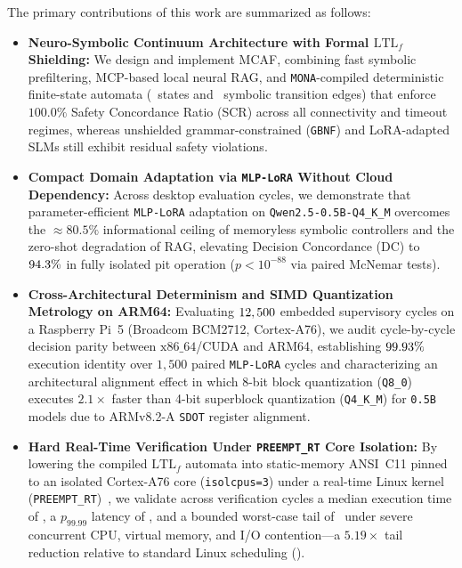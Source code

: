 \documentclass{ieeeaccess}
\begin{document}
The primary contributions of this work are summarized as follows:
\begin{itemize}
    \item \textbf{Neuro-Symbolic Continuum Architecture with Formal $\mathrm{LTL}_f$ Shielding:} We design and implement MCAF, combining fast symbolic prefiltering, MCP-based local neural RAG, and \texttt{MONA}-compiled deterministic finite-state automata (\ShieldStatesTotal~states and \ShieldEdgesTotal~symbolic transition edges) that enforce $100.0\%$ Safety Concordance Ratio (\textsc{SCR}) across all connectivity and timeout regimes, whereas unshielded grammar-constrained (\texttt{GBNF}) and LoRA-adapted SLMs still exhibit residual safety violations.
    \item \textbf{Compact Domain Adaptation via \texttt{MLP-LoRA} Without Cloud Dependency:} Across {\TotalDesktopCycles} desktop evaluation cycles, we demonstrate that parameter-efficient \texttt{MLP-LoRA} adaptation on \texttt{Qwen2.5-0.5B-Q4\_K\_M} overcomes the $\approx 80.5\%$ informational ceiling of memoryless symbolic controllers and the zero-shot degradation of RAG, elevating Decision Concordance (\textsc{DC}) to $94.3\%$ in fully isolated pit operation ($p < 10^{-88}$ via paired McNemar tests).
    \item \textbf{Cross-Architectural Determinism and SIMD Quantization Metrology on ARM64:} Evaluating $12,500$ embedded supervisory cycles on a Raspberry Pi~5 (Broadcom BCM2712, Cortex-A76), we audit cycle-by-cycle decision parity between $\text{x86\_64}$/CUDA and ARM64, establishing $99.93\%$ execution identity over $1{,}500$ paired \texttt{MLP-LoRA} cycles and characterizing an architectural alignment effect in which 8-bit block quantization (\texttt{Q8\_0}) executes $2.1\times$ faster than 4-bit superblock quantization (\texttt{Q4\_K\_M}) for \texttt{0.5B} models due to ARMv8.2-A \texttt{SDOT} register alignment.
    \item \textbf{Hard Real-Time Verification Under \texttt{PREEMPT\_RT} Core Isolation:} By lowering the compiled $\mathrm{LTL}_f$ automata into static-memory ANSI~C11 pinned to an isolated Cortex-A76 core (\texttt{isolcpus=3}) under a real-time Linux kernel (\texttt{PREEMPT\_RT})~\cite{reghenzani2019rt}, we validate across {\TotalCShieldCycles} verification cycles a median execution time of \CShieldMedianNs, a $p_{99.99}$ latency of \CShieldPFourNinesNs, and a bounded worst-case tail of \CShieldRTStressedMaxUs\ under severe concurrent CPU, virtual memory, and I/O contention---a $5.19\times$ tail reduction relative to standard Linux scheduling (\CShieldStdMaxUs).
\end{itemize}
\end{document}
